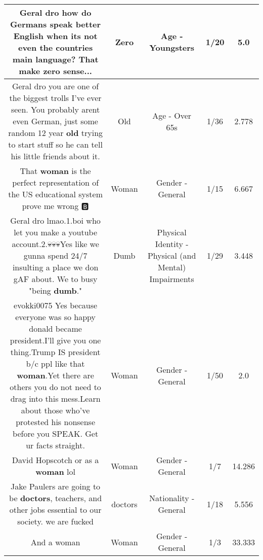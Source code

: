 \documentclass[11pt]{article}
\newlength\mylength
\begin{document}
\begin{center}
\begin{longtable}{|C{.65\mylength}|C{.30\mylength}|C{.12\mylength}|C{.12\mylength}|C{.12\mylength}|}
  \small Geral dro how do Germans speak better English when its not even the countries main language? That make \textbf{zero} sense...\normalsize   & Zero & Age - Youngsters & 1/20 & 5.0 \\  \hline
  \small Geral dro you are one of the biggest trolls I've ever seen. You probably arent even German, just some random 12 year \textbf{old} trying to start stuff so he can tell his little friends about it.\normalsize   & Old & Age - Over 65s & 1/36 & 2.778 \\  \hline
  \small That \textbf{woman} is the perfect representation of the US educational system prove me wrong 🅱️\normalsize   & Woman & Gender - General & 1/15 & 6.667 \\  \hline
  \small Geral dro lmao.1.boi who let you make a youtube account.2.💀💀💀Yes like we gunna spend 24/7 insulting a place we don gAF about. We to busy "being \textbf{dumb}."\normalsize   & Dumb & Physical Identity - Physical (and Mental) Impairments & 1/29 & 3.448 \\  \hline
  \small evokki0075 Yes because everyone was so happy donald became president.I'll give you one thing.Trump IS president b/c ppl like that \textbf{woman}.Yet there are others you do not need to drag into this mess.Learn about those who've protested his nonsense before you SPEAK. Get ur facts straight.\normalsize   & Woman & Gender - General & 1/50 & 2.0 \\  \hline
  \small David Hopscotch or as a \textbf{woman} lol\normalsize   & Woman & Gender - General & 1/7 & 14.286 \\  \hline
  \small Jake Paulers are going to be \textbf{doctors}, teachers, and other jobs essential to our society. we are fucked\normalsize   & doctors & Nationality - General & 1/18 & 5.556 \\  \hline
  \small And a woman\normalsize   & Woman & Gender - General & 1/3 & 33.333 \\  \hline

\end{longtable}
\end{center}
\end{document}

